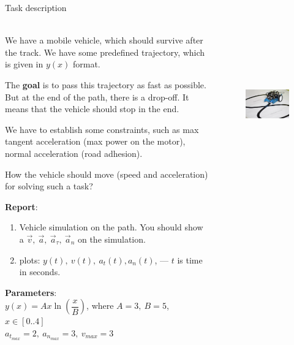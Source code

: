 \documentclass[aspectratio=169]{beamer}
\begin{document}
\begin{frame}[t]{Task description}
\framesubtitle{}
\vspace*{-0.4cm}
  \begin{columns}[T,onlytextwidth]
    \begin{column}{0.69\textwidth}
      \scriptsize
      We have a mobile vehicle, which should survive after the track. We have some predefined trajectory, which is given in $y(x)$ format. 
      \medskip

      The \textbf{goal} is to pass this trajectory as fast as possible. But at the end of the path, there is a drop-off. It means that the vehicle should stop in the end.
            \medskip
      
      We have to establish some constraints, such as max tangent acceleration (max power on the motor), normal acceleration (road adhesion).
      \medskip
      
      How the vehicle should move (speed and acceleration) for solving such a task?

      \textbf{Report}:
      \begin{enumerate}
        \item Vehicle simulation on the path. You should show a $\vec{v},\ \vec{a},\ \vec{a}_\tau,\ \vec{a}_n$ on the simulation.
        \item plots: $y(t),\ v(t),\ a_t(t), a_n(t)$, --- $t$ is time in seconds. 
      \end{enumerate}
      \textbf{Parameters}:\\
      $y(x) = Ax \ln (\dfrac{x}{B})$, where $A = 3,\ B = 5$, $x\in [0..4]$ \\
      $a_{t_{max}} = 2,\ a_{n_{max}} = 3,\ v_{max} = 3$
    \end{column}
    \begin{column}{0.29\textwidth}
      \begin{figure}[H]
        \centering\includegraphics[height=6cm,width=1\textwidth,keepaspectratio]{picpic.png}
      \end{figure}
    \end{column}
  \end{columns}
\end{frame}
\end{document}
